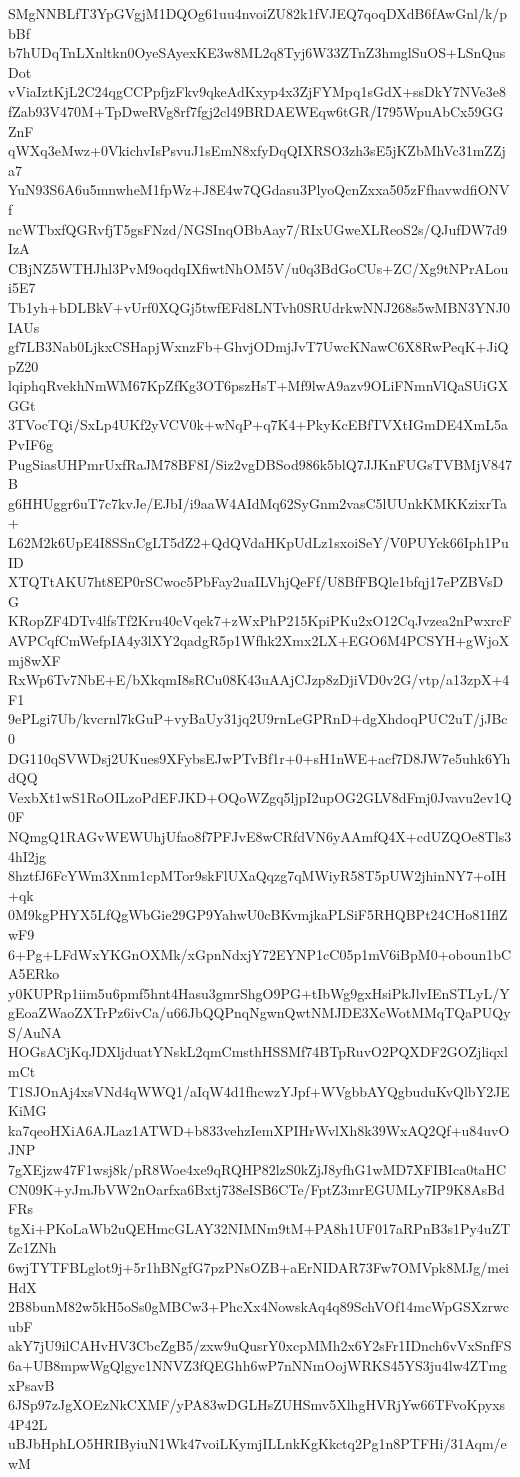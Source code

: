 SMgNNBLfT3YpGVgjM1DQOg61uu4nvoiZU82k1fVJEQ7qoqDXdB6fAwGnl/k/pbBf
b7hUDqTnLXnltkn0OyeSAyexKE3w8ML2q8Tyj6W33ZTnZ3hmglSuOS+LSnQusDot
vViaIztKjL2C24qgCCPpfjzFkv9qkeAdKxyp4x3ZjFYMpq1sGdX+ssDkY7NVe3e8
fZab93V470M+TpDweRVg8rf7fgj2cl49BRDAEWEqw6tGR/I795WpuAbCx59GGZnF
qWXq3eMwz+0VkichvIsPsvuJ1sEmN8xfyDqQIXRSO3zh3sE5jKZbMhVc31mZZja7
YuN93S6A6u5mnwheM1fpWz+J8E4w7QGdasu3PlyoQcnZxxa505zFfhavwdfiONVf
ncWTbxfQGRvfjT5gsFNzd/NGSInqOBbAay7/RIxUGweXLReoS2s/QJufDW7d9IzA
CBjNZ5WTHJhl3PvM9oqdqIXfiwtNhOM5V/u0q3BdGoCUs+ZC/Xg9tNPrALoui5E7
Tb1yh+bDLBkV+vUrf0XQGj5twfEFd8LNTvh0SRUdrkwNNJ268s5wMBN3YNJ0IAUs
gf7LB3Nab0LjkxCSHapjWxnzFb+GhvjODmjJvT7UwcKNawC6X8RwPeqK+JiQpZ20
lqiphqRvekhNmWM67KpZfKg3OT6pszHsT+Mf9lwA9azv9OLiFNmnVlQaSUiGXGGt
3TVocTQi/SxLp4UKf2yVCV0k+wNqP+q7K4+PkyKcEBfTVXtIGmDE4XmL5aPvIF6g
PugSiasUHPmrUxfRaJM78BF8I/Siz2vgDBSod986k5blQ7JJKnFUGsTVBMjV847B
g6HHUggr6uT7c7kvJe/EJbI/i9aaW4AIdMq62SyGnm2vasC5lUUnkKMKKzixrTa+
L62M2k6UpE4I8SSnCgLT5dZ2+QdQVdaHKpUdLz1sxoiSeY/V0PUYck66Iph1PuID
XTQTtAKU7ht8EP0rSCwoc5PbFay2uaILVhjQeFf/U8BfFBQle1bfqj17ePZBVsDG
KRopZF4DTv4lfsTf2Kru40cVqek7+zWxPhP215KpiPKu2xO12CqJvzea2nPwxrcF
AVPCqfCmWefpIA4y3lXY2qadgR5p1Wfhk2Xmx2LX+EGO6M4PCSYH+gWjoXmj8wXF
RxWp6Tv7NbE+E/bXkqmI8sRCu08K43uAAjCJzp8zDjiVD0v2G/vtp/a13zpX+4F1
9ePLgi7Ub/kvcrnl7kGuP+vyBaUy31jq2U9rnLeGPRnD+dgXhdoqPUC2uT/jJBc0
DG110qSVWDsj2UKues9XFybsEJwPTvBf1r+0+sH1nWE+acf7D8JW7e5uhk6YhdQQ
VexbXt1wS1RoOILzoPdEFJKD+OQoWZgq5ljpI2upOG2GLV8dFmj0Jvavu2ev1Q0F
NQmgQ1RAGvWEWUhjUfao8f7PFJvE8wCRfdVN6yAAmfQ4X+cdUZQOe8Tls34hI2jg
8hztfJ6FcYWm3Xnm1cpMTor9skFlUXaQqzg7qMWiyR58T5pUW2jhinNY7+oIH+qk
0M9kgPHYX5LfQgWbGie29GP9YahwU0cBKvmjkaPLSiF5RHQBPt24CHo81IflZwF9
6+Pg+LFdWxYKGnOXMk/xGpnNdxjY72EYNP1cC05p1mV6iBpM0+oboun1bCA5ERko
y0KUPRp1iim5u6pmf5hnt4Hasu3gmrShgO9PG+tIbWg9gxHsiPkJlvIEnSTLyL/Y
gEoaZWaoZXTrPz6ivCa/u66JbQQPnqNgwnQwtNMJDE3XcWotMMqTQaPUQyS/AuNA
HOGsACjKqJDXljduatYNskL2qmCmsthHSSMf74BTpRuvO2PQXDF2GOZjliqxlmCt
T1SJOnAj4xsVNd4qWWQ1/aIqW4d1fhcwzYJpf+WVgbbAYQgbuduKvQlbY2JEKiMG
ka7qeoHXiA6AJLaz1ATWD+b833vehzIemXPIHrWvlXh8k39WxAQ2Qf+u84uvOJNP
7gXEjzw47F1wsj8k/pR8Woe4xe9qRQHP82lzS0kZjJ8yfhG1wMD7XFIBIca0taHC
CN09K+yJmJbVW2nOarfxa6Bxtj738eISB6CTe/FptZ3mrEGUMLy7IP9K8AsBdFRs
tgXi+PKoLaWb2uQEHmcGLAY32NIMNm9tM+PA8h1UF017aRPnB3s1Py4uZTZc1ZNh
6wjTYTFBLglot9j+5r1hBNgfG7pzPNsOZB+aErNIDAR73Fw7OMVpk8MJg/meiHdX
2B8bunM82w5kH5oSs0gMBCw3+PhcXx4NowskAq4q89SchVOf14mcWpGSXzrwcubF
akY7jU9ilCAHvHV3CbcZgB5/zxw9uQusrY0xcpMMh2x6Y2sFr1IDnch6vVxSnfFS
6a+UB8mpwWgQlgyc1NNVZ3fQEGhh6wP7nNNmOojWRKS45YS3ju4lw4ZTmgxPsavB
6JSp97zJgXOEzNkCXMF/yPA83wDGLHsZUHSmv5XlhgHVRjYw66TFvoKpyxs4P42L
uBJbHphLO5HRIByiuN1Wk47voiLKymjILLnkKgKkctq2Pg1n8PTFHi/31Aqm/ewM
